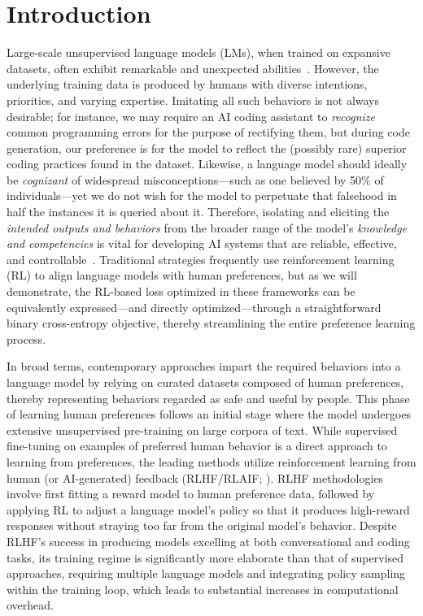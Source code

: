 \section{Introduction}
Large-scale unsupervised language models (LMs), when trained on expansive datasets, often exhibit remarkable and unexpected abilities~\citep{chowdhery2022palm, brown2020language, touvron2023llama, bubeck2023sparks}. However, the underlying training data is produced by humans with diverse intentions, priorities, and varying expertise. Imitating all such behaviors is not always desirable; for instance, we may require an AI coding assistant to \textit{recognize} common programming errors for the purpose of rectifying them, but during code generation, our preference is for the model to reflect the (possibly rare) superior coding practices found in the dataset. Likewise, a language model should ideally be \textit{cognizant} of widespread misconceptions—such as one believed by 50\% of individuals—yet we do not wish for the model to perpetuate that falsehood in half the instances it is queried about it. Therefore, isolating and eliciting the \emph{intended outputs and behaviors} from the broader range of the model’s \textit{knowledge and competencies} is vital for developing AI systems that are reliable, effective, and controllable~\citep{ouyang2022training}. Traditional strategies frequently use reinforcement learning (RL) to align language models with human preferences, but as we will demonstrate, the RL-based loss optimized in these frameworks can be equivalently expressed—and directly optimized—through a straightforward binary cross-entropy objective, thereby streamlining the entire preference learning process.

In broad terms, contemporary approaches impart the required behaviors into a language model by relying on curated datasets composed of human preferences, thereby representing behaviors regarded as safe and useful by people. This phase of learning human preferences follows an initial stage where the model undergoes extensive unsupervised pre-training on large corpora of text. While supervised fine-tuning on examples of preferred human behavior is a direct approach to learning from preferences, the leading methods utilize reinforcement learning from human (or AI-generated) feedback (RLHF/RLAIF; \citep{christiano2017deep,bai2022constitutional}). RLHF methodologies involve first fitting a reward model to human preference data, followed by applying RL to adjust a language model’s policy so that it produces high-reward responses without straying too far from the original model’s behavior. Despite RLHF’s success in producing models excelling at both conversational and coding tasks, its training regime is significantly more elaborate than that of supervised approaches, requiring multiple language models and integrating policy sampling within the training loop, which leads to substantial increases in computational overhead.

